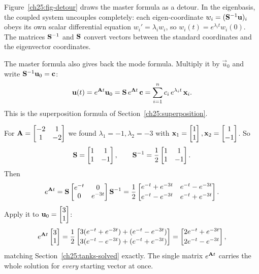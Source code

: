 \begin{intuitionbox}
Figure~\ref{ch25:fig-detour} draws the master formula as a detour.
In the eigenbasis, the coupled system uncouples completely: each eigen-coordinate
$w_i = (\mathbf{S}^{-1}\mathbf{u})_i$ obeys its own scalar differential equation $w_i' = \lambda_i w_i$, so
$w_i(t) = e^{\lambda_i t} w_i(0)$. The matrices $\mathbf{S}^{-1}$ and $\mathbf{S}$ convert
vectors between the standard coordinates and the eigenvector coordinates.
\end{intuitionbox}

The master formula also gives back the mode formula. Multiply it by
$\vec{u}_0$ and write $\mathbf{S}^{-1}\mathbf{u}_0 = \mathbf{c}$:
\[
  \mathbf{u}(t) = e^{\mathbf{A}t}\mathbf{u}_0
  = \mathbf{S}\,e^{\mathbf{\Lambda}t}\,\mathbf{c}
  = \sum_{i=1}^n c_i\, e^{\lambda_i t}\,\mathbf{x}_i.
\]
This is the superposition formula of
Section~\ref{ch25:superposition}.

\begin{example}
\label{ch25:tanks-exp}
For $\mathbf{A} = \begin{bmatrix}-2&1\\1&-2\end{bmatrix}$ we found
$\lambda_1=-1,\lambda_2=-3$ with $\mathbf{x}_1=\begin{bmatrix}1\\1\end{bmatrix},\mathbf{x}_2=\begin{bmatrix}1\\-1\end{bmatrix}$.
So
\[
  \mathbf{S} = \begin{bmatrix}1&1\\1&-1\end{bmatrix},
  \qquad
  \mathbf{S}^{-1} = \frac12\begin{bmatrix}1&1\\1&-1\end{bmatrix}.
\]
Then
\[
  e^{\mathbf{A}t}
  = \mathbf{S}
    \begin{bmatrix}e^{-t}&0\\0&e^{-3t}\end{bmatrix}
    \mathbf{S}^{-1}
  = \frac12
    \begin{bmatrix}
      e^{-t}+e^{-3t} & e^{-t}-e^{-3t}\\[2pt]
      e^{-t}-e^{-3t} & e^{-t}+e^{-3t}
    \end{bmatrix}.
\]
Apply it to $\mathbf{u}_0=\begin{bmatrix}3\\1\end{bmatrix}$:
\[
  e^{\mathbf{A}t}\begin{bmatrix}3\\1\end{bmatrix}
  = \frac12\begin{bmatrix}3(e^{-t}+e^{-3t}) + (e^{-t}-e^{-3t})\\[2pt]
                   3(e^{-t}-e^{-3t}) + (e^{-t}+e^{-3t})\end{bmatrix}
  = \begin{bmatrix}2e^{-t}+e^{-3t}\\[2pt] 2e^{-t}-e^{-3t}\end{bmatrix},
\]
matching Section~\ref{ch25:tanks-solved} exactly. The single matrix $e^{\mathbf{A}t}$
carries the whole solution for \emph{every} starting vector at once.
\end{example}


